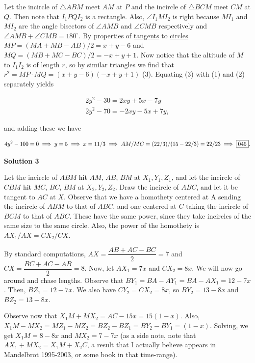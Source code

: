 \begin{enumerate}
 Let the incircle of $\triangle ABM$ meet $AM$ at $P$ and the incircle of $\triangle BCM$ meet $CM$ at $Q$. Then note that $I_1 P Q I_2$ is a rectangle. Also, $\angle I_1 M I_2$ is right because $MI_1$ and $MI_2$ are the angle bisectors of $\angle AMB$ and $\angle CMB$ respectively and $\angle AMB + \angle CMB = 180^\circ$. By properties of \href{https://artofproblemsolving.com/wiki/index.php?title=Tangent\_(geometry)}{tangents} to \href{https://artofproblemsolving.com/wiki/index.php?title=Circle}{circles} $MP = (MA + MB - AB)/2 = x + y - 6$ and $MQ = (MB + MC - BC)/2 = - x + y + 1$. Now notice that the altitude of $M$ to $I_1 I_2$ is of length $r$, so by similar triangles we find that $r^2 = MP \cdot MQ = (x + y - 6)( - x + y + 1)$ (3). Equating (3) with (1) and (2) separately yields

 
 \begin{align*} 2y^2 - 30 = 2xy + 5x - 7y \\  2y^2 - 70 = - 2xy - 5x + 7y, \end{align*}


 and adding these we have

 
 \[4y^2 - 100 = 0\implies y = 5\implies x = 11/3 \\ \implies AM/MC = (22/3)/(15 - 22/3) = 22/23 \implies \boxed{045}.\]




\textbf{Solution 3}

Let the incircle of $ABM$ hit $AM$, $AB$, $BM$ at $X_{1},Y_{1},Z_{1}$, and let the incircle of $CBM$ hit $MC$, $BC$, $BM$ at $X_{2},Y_{2},Z_{2}$. Draw the incircle of $ABC$, and let it be tangent to $AC$ at $X$. Observe that we have a homothety centered at A sending the incircle of $ABM$ to that of $ABC$, and one centered at $C$ taking the incircle of $BCM$ to that of $ABC$. These have the same power, since they take incircles of the same size to the same circle. Also, the power of the homothety is $AX_{1}/AX=CX_{2}/CX$.

 By standard computations, $AX=\dfrac{AB+AC-BC}{2}=7$ and $CX=\dfrac{BC+AC-AB}{2}=8$. Now, let $AX_{1}=7x$ and $CX_{2}=8x$. We will now go around and chase lengths. Observe that $BY_{1}=BA-AY_{1}=BA-AX_{1}=12-7x$. Then, $BZ_{1}=12-7x$. We also have $CY_{2}=CX_{2}=8x$, so $BY_{2}=13-8x$ and $BZ_{2}=13-8x$.

 Observe now that $X_{1}M+MX_{2}=AC-15x=15(1-x)$. Also,$X_{1}M-MX_{2}=MZ_{1}-MZ_{2}=BZ_{2}-BZ_{1}=BY_{2}-BY_{1}=(1-x)$. Solving, we get $X_{1}M=8-8x$ and $MX_{2}=7-7x$ (as a side note, note that $AX_{1}+MX_{2}=X_{1}M+X_{2}C$, a result that I actually believe appears in Mandelbrot 1995-2003, or some book in that time-range).


\end{enumerate}
